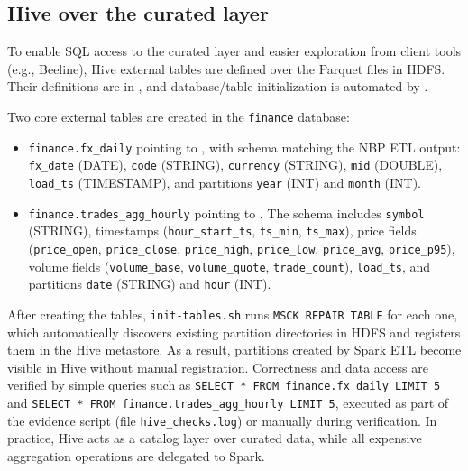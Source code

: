 \documentclass{article}
\begin{document}
\subsection{Hive over the curated layer}

To enable SQL access to the curated layer and easier exploration from
client tools (e.g., Beeline), Hive external tables are defined over the
Parquet files in HDFS. Their definitions are in
, and database/table initialization is
automated by .

Two core external tables are created in the \texttt{finance} database:

\begin{itemize}
\item
  \texttt{finance.fx\_daily} pointing to
  , with schema matching the NBP
  ETL output: \texttt{fx\_date} (DATE), \texttt{code} (STRING),
  \texttt{currency} (STRING), \texttt{mid} (DOUBLE),
  \texttt{load\_ts} (TIMESTAMP), and partitions \texttt{year} (INT) and
  \texttt{month} (INT).
\item
  \texttt{finance.trades\_agg\_hourly} pointing to
  . The schema
  includes \texttt{symbol} (STRING), timestamps (\texttt{hour\_start\_ts},
  \texttt{ts\_min}, \texttt{ts\_max}), price fields
  (\texttt{price\_open}, \texttt{price\_close}, \texttt{price\_high},
  \texttt{price\_low}, \texttt{price\_avg}, \texttt{price\_p95}), volume
  fields (\texttt{volume\_base}, \texttt{volume\_quote},
  \texttt{trade\_count}), \texttt{load\_ts}, and partitions
  \texttt{date} (STRING) and \texttt{hour} (INT).
\end{itemize}

After creating the tables, \texttt{init-tables.sh} runs
\texttt{MSCK REPAIR TABLE} for each one, which automatically discovers
existing partition directories in HDFS and registers them in the Hive
metastore. As a result, partitions created by Spark ETL become visible
in Hive without manual registration. Correctness and data access are
verified by simple queries such as
\texttt{SELECT * FROM finance.fx\_daily LIMIT 5} and
\texttt{SELECT * FROM finance.trades\_agg\_hourly LIMIT 5}, executed as
part of the evidence script 
(file \texttt{hive\_checks.log}) or manually during verification. In
practice, Hive acts as a catalog layer over curated data, while all
expensive aggregation operations are delegated to Spark.
\end{document}
